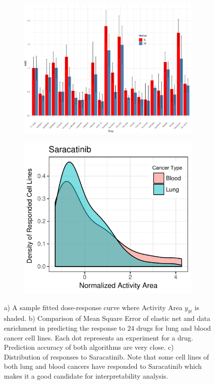 \begin{figure}
\begin{subfigure}[b]{0.32\textwidth}
	\end{subfigure} ~
	\begin{subfigure}[b]{0.30\textwidth}
		\includegraphics[width=\textwidth]{./img/lung-blood-barplot.pdf}
		\caption{}\label{fig:prediction}
	\end{subfigure}
	\begin{subfigure}[b]{0.29\textwidth}
	\includegraphics[width=\textwidth,]{./img/Saracatinib.pdf}
	\caption{}\label{fig:Saracatinib}
	\end{subfigure}
	\caption{a) A sample fitted dose-response curve where Activity Area $y_{gi}$ is shaded. b) Comparison of Mean Square Error of elastic net and data enrichment in predicting the response to 24 drugs for lung and blood cancer cell lines. Each dot represents an experiment for a drug. Prediction accuracy of both algorithms are very close. c) Distribution of responses to Saracatinib. Note that some cell lines of both lung and blood cancers have responded to Saracatinib which makes it a good candidate for interpretability analysis.}
	\label{fig syn2}
	\end{figure}


